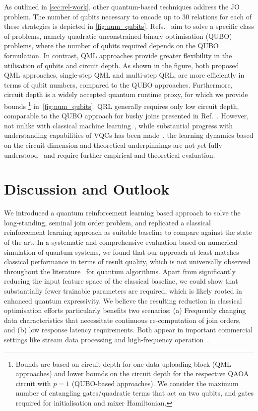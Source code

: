 \documentclass[10pt, conference]{IEEEtran}
\begin{document}
As outlined in \autoref{sec:rel-work}, other quantum-based techniques address the JO problem.
The number of qubits necessary to encode up to 30 relations for each of these strategies is depicted in \autoref{fig:num_qubits}.
Refs.~\cite{nayak23, schoenberger23, schoenberger23:qdsm, schoenberger24} aim to solve a specific class of problems, namely quadratic unconstrained binary optimisation (QUBO) problems, where the number of qubits required depends on the QUBO formulation.
In contrast, QML approaches provide greater flexibility in the utilisation of qubits and circuit depth.
As shown in the figure, both proposed QML approaches, single-step QML and multi-step QRL, are more efficiently in terms of qubit numbers, compared to the QUBO approaches.
Furthermore, circuit depth is a widely accepted quantum runtime proxy, for which we provide bounds%
\footnote{Bounds are based on circuit depth for one data uploading block (QML approaches) and lower bounds on the circuit depth for the respective QAOA~\cite{farhi14} circuit with \(p=1\) (QUBO-based approaches).
We consider the maximum number of entangling gates/quadratic terms that act on two qubits, and gates required for initialisation and mixer Hamiltonian.}
in~\autoref{fig:num_qubits}.
QRL generally requires only low circuit depth, comparable to the 
QUBO approach for bushy joins presented in
Ref.~\cite{schoenberger23:qdsm}.
However, not unlike with classical machine learning~\cite{goodfellow16}, while substantial progress with
understanding capabilities of VQCs has been made~\cite{landman22}, the learning dynamics based on the circuit dimension and theoretical underpinnings are not yet fully understood~\cite{schuld22} and require further empirical and theoretical evaluation.

\section{Discussion and Outlook}
\label{sec:concl}
We introduced a quantum reinforcement learning based approach to solve the long-standing, seminal join order problem, and replicated a
classical reinforcement learning approach as suitable baseline to compare against the state of the art.
In a systematic and comprehensive evaluation based on numerical simulation of quantum systems, we found that our approach at least matches classical performance in terms of result quality, which is not universally observed throughout the literature~\cite{meyer22} for quantum algorithms.
Apart from significantly reducing the input feature space of the classical baseline, we could show that substantially fewer trainable parameters are required, which is likely
rooted in enhanced quantum expressivity.
We believe the resulting reduction in classical optimisation efforts particularly benefits two scenarios: (a) Frequently changing data characteristics that necessitate continuous re-computation of join orders, and (b) low response latency requirements. Both appear in important commercial settings like stream data processing and high-frequency operation~\cite{Dean:2013}. 
\end{document}
